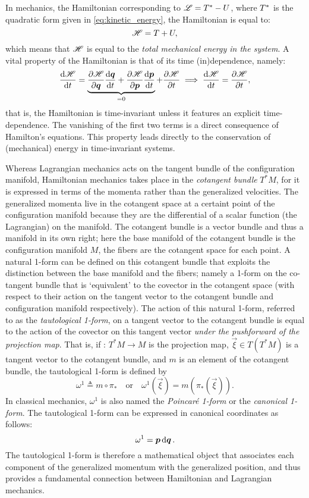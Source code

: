 In mechanics, the Hamiltonian corresponding to $\mathscr{L} = T^* - U$, where $T^*$ is the quadratic form given in \cref{eq:kinetic_energy}, the Hamiltonian is equal to:
\begin{equation}
    \mathscr{H} = T + U,
\end{equation}
which means that $\mathscr{H}$ is equal to the \emph{total mechanical energy in the system}. A vital property of the Hamiltonian is that of its time (in)dependence, namely:
$$ 
\dv{\ensuremath{\mathscr{H}}}{t} = \underbrace{\pdv{\ensuremath{\mathscr{H}}}{\ensuremath{\vb*{q}}}\dv{\ensuremath{\vb*{q}}}{t} + \pdv{\ensuremath{\mathscr{H}}}{\ensuremath{\vb*{p}}}\dv{\ensuremath{\vb*{p}}}{t}}_{=0} + \pdv{\ensuremath{\mathscr{H}}}{t} \implies \dv{\ensuremath{\mathscr{H}}}{t} = \pdv{\ensuremath{\mathscr{H}}}{t},
$$
that is, the Hamiltonian is time-invariant unless it features an explicit time-dependence. The vanishing of the first two terms is a direct consequence of Hamilton's equations. This property leads directly to the conservation of (mechanical) energy in time-invariant systems.

Whereas Lagrangian mechanics acts on the tangent bundle of the configuration manifold, Hamiltonian mechanics takes place in the \emph{cotangent bundle} $T^*M$, for it is expressed in terms of the momenta rather than the generalized velocities. The generalized momenta live in the cotangent space at a certaint point of the configuration manifold because they are the differential of a scalar function (the Lagrangian) on the manifold. The cotangent bundle is a vector bundle and thus a manifold in its own right; here the base manifold of the cotangent bundle is the configuration manifold $M$, the fibers are the cotangent space for each point. A natural 1-form can be defined on this cotangent bundle that exploits the distinction between the base manifold and the fibers; namely a 1-form on the co-tangent bundle that is `equivalent' to the covector in the cotangent space (with respect to their action on the tangent vector to the cotangent bundle and configuration manifold respectively). The action of this natural 1-form, referred to as the \emph{tautological 1-form}, on a tangent vector to the cotangent bundle is equal to the action of the covector on this tangent vector \emph{under the pushforward of the projection map}. That is, if $:\,T^*M \to M$ is the projection map, $\vec{\xi} \in T(T^*M)$ is a tangent vector to the cotangent bundle, and $m$ is an element of the cotangent bundle, the tautological 1-form  is defined by \cite{Arnold1989,Abraham1978}
$$ \omega^1 \triangleq m\circ\pi_* \quad\text{or}\quad \omega^1(\vec{\xi}) = m(\pi_*(\vec{\xi})).  $$
In classical mechanics, $\omega^1$ is also named the \emph{Poincaré 1-form} or the \emph{canonical 1-form}. The tautological 1-form can be expressed in canonical coordinates as follows:
$$ \omega^1 = \vb*{p}\dd{\ensuremath{\vb*{q}}}. $$
The tautological 1-form is therefore a mathematical object that associates each component of the generalized momentum with the generalized position, and thus provides a fundamental connection between Hamiltonian and Lagrangian mechanics.

